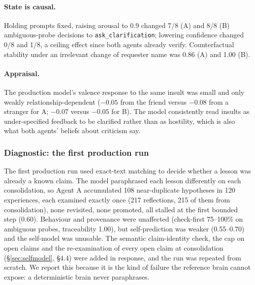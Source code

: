 \documentclass[11pt]{article}
\begin{document}
\paragraph{State is causal.} Holding prompts fixed, raising arousal to 0.9 changed 7/8 (A) and 8/8 (B) ambiguous-probe decisions to \texttt{ask\_clarification}; lowering confidence changed 0/8 and 1/8, a ceiling effect since both agents already verify. Counterfactual stability under an irrelevant change of requester name was 0.86 (A) and 1.00 (B).

\paragraph{Appraisal.} The production model's valence response to the same insult was small and only weakly relationship-dependent ($-0.05$ from the friend versus $-0.08$ from a stranger for A; $-0.07$ versus $-0.05$ for B). The model consistently read insults as under-specified feedback to be clarified rather than as hostility, which is also what both agents' beliefs about criticism say.

\FloatBarrier
\subsubsection{Diagnostic: the first production run}\label{sec:diagnostic}
The first production run used exact-text matching to decide whether a lesson was already a known claim. The model paraphrased each lesson differently on each consolidation, so Agent A accumulated 108 near-duplicate hypotheses in 120 experiences, each examined exactly once (217 reflections, 215 of them from consolidation), none revisited, none promoted, all stalled at the first bounded step (0.60). Behaviour and provenance were unaffected (check-first 75--100\% on ambiguous probes, traceability 1.00), but self-prediction was weaker (0.55--0.70) and the self-model was unusable. The semantic claim-identity check, the cap on open claims and the re-examination of every open claim at consolidation (\S\ref{sec:selfmodel}, \S4.4) were added in response, and the run was repeated from scratch. We report this because it is the kind of failure the reference brain cannot expose: a deterministic brain never paraphrases.


\FloatBarrier
\end{document}
